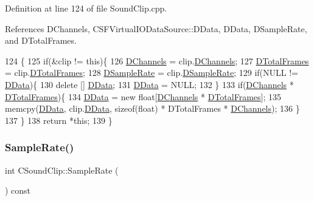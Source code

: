 Definition at line 124 of file Sound\+Clip.\+cpp.



References D\+Channels, C\+S\+F\+Virtual\+I\+O\+Data\+Source\+::\+D\+Data, D\+Data, D\+Sample\+Rate, and D\+Total\+Frames.


\begin{DoxyCode}
124                                                        \{
125     \textcolor{keywordflow}{if}(&clip != \textcolor{keyword}{this})\{
126         \hyperlink{classCSoundClip_a01aaf0b87b9b8226c77a6931d03d6a64}{DChannels} = clip.\hyperlink{classCSoundClip_a01aaf0b87b9b8226c77a6931d03d6a64}{DChannels};
127         \hyperlink{classCSoundClip_ab0d9eb261d09fa2a106658276f37285b}{DTotalFrames} = clip.\hyperlink{classCSoundClip_ab0d9eb261d09fa2a106658276f37285b}{DTotalFrames};
128         \hyperlink{classCSoundClip_ac1b9306140da2f89f6178833e0a9b887}{DSampleRate} = clip.\hyperlink{classCSoundClip_ac1b9306140da2f89f6178833e0a9b887}{DSampleRate};
129         \textcolor{keywordflow}{if}(NULL != \hyperlink{classCSoundClip_a220921a0c81e5c63e2cd3c55c75878b1}{DData})\{
130             \textcolor{keyword}{delete} [] \hyperlink{classCSoundClip_a220921a0c81e5c63e2cd3c55c75878b1}{DData};
131             \hyperlink{classCSoundClip_a220921a0c81e5c63e2cd3c55c75878b1}{DData} = NULL;
132         \}
133         \textcolor{keywordflow}{if}(\hyperlink{classCSoundClip_a01aaf0b87b9b8226c77a6931d03d6a64}{DChannels} * \hyperlink{classCSoundClip_ab0d9eb261d09fa2a106658276f37285b}{DTotalFrames})\{
134             \hyperlink{classCSoundClip_a220921a0c81e5c63e2cd3c55c75878b1}{DData} = \textcolor{keyword}{new} \textcolor{keywordtype}{float}[\hyperlink{classCSoundClip_a01aaf0b87b9b8226c77a6931d03d6a64}{DChannels} * \hyperlink{classCSoundClip_ab0d9eb261d09fa2a106658276f37285b}{DTotalFrames}];
135             memcpy(\hyperlink{classCSoundClip_a220921a0c81e5c63e2cd3c55c75878b1}{DData}, clip.\hyperlink{classCSoundClip_a220921a0c81e5c63e2cd3c55c75878b1}{DData}, \textcolor{keyword}{sizeof}(\textcolor{keywordtype}{float}) * DTotalFrames * 
      \hyperlink{classCSoundClip_a01aaf0b87b9b8226c77a6931d03d6a64}{DChannels});
136         \}
137     \}
138     \textcolor{keywordflow}{return} *\textcolor{keyword}{this};
139 \}
\end{DoxyCode}
\hypertarget{classCSoundClip_ac89dc3d2f25a43fcd97268ec9828f709}{}\label{classCSoundClip_ac89dc3d2f25a43fcd97268ec9828f709} 
\subsubsection{\texorpdfstring{Sample\+Rate()}{SampleRate()}}
{\footnotesize\ttfamily int C\+Sound\+Clip\+::\+Sample\+Rate (\begin{DoxyParamCaption}{ }\end{DoxyParamCaption}) const\hspace{0.3cm}{\ttfamily [inline]}}




